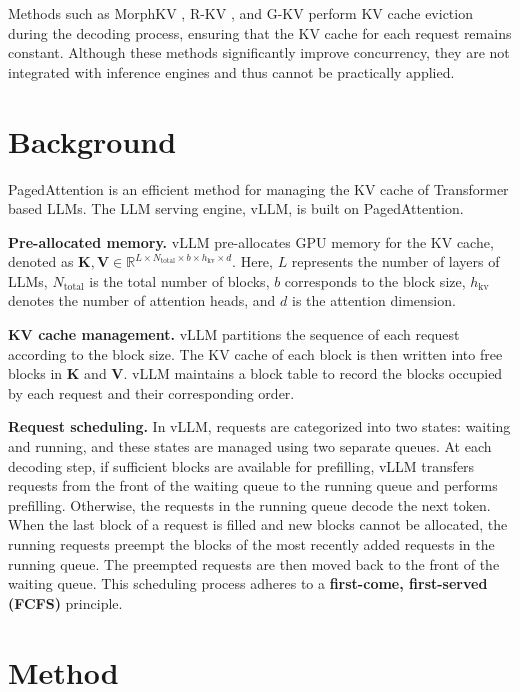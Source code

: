\documentclass[11pt]{article}
\begin{document}
Methods such as MorphKV \citep{morghkv}, R-KV \citep{rkv}, and  G-KV \citep{gkv} perform KV cache eviction during the decoding process, ensuring that the KV cache for each request remains constant. Although these methods significantly improve concurrency, they are not integrated with inference engines and thus cannot be practically applied. 

\section{Background}



PagedAttention \citep{kwon2023efficient} is an efficient method for managing the KV cache of Transformer \citep{vaswani2017attention} based LLMs. The LLM serving engine, vLLM, is built on PagedAttention. 

\textbf{Pre-allocated memory.} vLLM pre-allocates GPU memory for the KV cache, denoted as $\mathbf{K}, \mathbf{V} \in \mathbb{R}^{L  \times N_{\text{total}} \times b \times h_{\text{kv}}\times d}$. Here, $L$ represents the number of layers of  LLMs, $N_{\text{total}}$ is the total number of blocks, $b$ corresponds to the block size, $h_{\text{kv}}$ denotes the number of attention heads, and $d$ is the attention dimension.

\textbf{KV cache management.} vLLM partitions the sequence of each request according to the block size. The KV cache of each block is then written into free blocks in $\mathbf{K}$ and $\mathbf{V}$. vLLM  maintains a block table to record the blocks occupied by each request and their corresponding order. 

\textbf{Request scheduling.} In vLLM, requests are categorized into two states: waiting and running, and these states are managed using two separate queues. At each decoding step, if sufficient blocks are available for prefilling, vLLM transfers requests from the front of the waiting queue to the running queue and performs prefilling. Otherwise, the requests in the running queue decode the next token. When the last block of a request is filled and new blocks cannot be allocated, the running requests preempt the blocks of the most recently added requests in the running queue. The preempted requests are then moved back to the front of the waiting queue. This scheduling process adheres to a \textbf{first-come, first-served (FCFS)} principle.




\section{Method}
\end{document}
